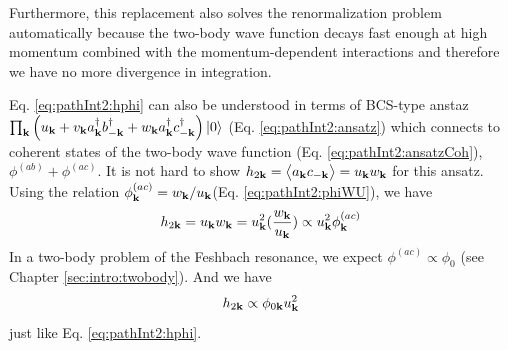 Furthermore, this replacement also solves the renormalization problem automatically because the two-body wave function decays fast enough at high momentum combined with the momentum-dependent interactions and therefore we have no more  divergence in integration.  

Eq. \ref{eq:pathInt2:hphi} can also be understood in terms of BCS-type anstaz $\prod_{\mathbf{k}}\left(u_{\mathbf{k}}+v_{\mathbf{k}}{}a^{\dagger}_{\mathbf{k}}{}b^{\dagger}_{-\mathbf{k}}+w_{\mathbf{k}}{}a^{\dagger}_{\mathbf{k}}{}c^{\dagger}_{-\mathbf{k}}\right)\left|0\right>$ (Eq. \ref{eq:pathInt2:ansatz}) which connects to coherent states of the two-body wave function (Eq. \ref{eq:pathInt2:ansatzCoh}), $\phi^{(ab)}+\phi^{(ac)}$.   It is not hard to show  $h_{2\mathbf{k}}=\bigl<{a_{\mathbf{k}}c_{-\mathbf{k}}}\bigr>=u_{\mathbf{k}}w_{\mathbf{k}}$ for this ansatz. Using the relation $\phi^{(ac)}_{\mathbf{k}}=w_{\mathbf{k}}/u_{\mathbf{k}}$(Eq. \ref{eq:pathInt2:phiWU}),  we have
\begin{equation}
h_{2\mathbf{k}}=u_{\mathbf{k}}w_{\mathbf{k}}=u_{\mathbf{k}}^{2}(\frac{w_{\mathbf{k}}}{u_{\mathbf{k}}})\propto{}u_{\mathbf{k}}^{2}\phi^{(ac)}_{\mathbf{k}}
\end{equation}
 In a two-body problem of the Feshbach resonance, we expect $\phi^{(ac)}\propto\phi_{0}$  (see Chapter \ref{sec:intro:twobody}).
 And we have 
 \begin{equation}
 h_{2\mathbf{k}}\propto\phi_{0\mathbf{k}}u_{\mathbf{k}}^{2}
 \end{equation}
just like Eq. \ref{eq:pathInt2:hphi}.



